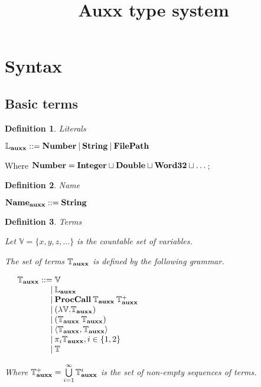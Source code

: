 \documentclass[a4paper]{article}
\date{}
\title{Auxx type system}
\newtheorem{defin}{Definition}
\begin{document}
\maketitle

\tableofcontents

\newpage

\section{Syntax}

\subsection{Basic terms}

\begin{defin} Literals

  $\mathbb{L}_{\bf auxx} ::= {\bf Number} \: | \: {\bf String} \: | \: {\bf FilePath}$
\end{defin}

Where ${\bf Number} = {\bf Integer} \sqcup {\bf Double} \sqcup  {\bf Word32} \sqcup \dots$;

\begin{defin} Name

  ${\bf Name}_{\bf auxx} ::= {\bf String}$

\end{defin}

\begin{defin} Terms

Let $\mathbb{V} = \{ x, y, z, \dots \}$ is the countable set of variables.

The set of terms $\mathbb{T}_{\bf auxx}$ is defined by the following grammar.

$\begin{array}{lll}
&\mathbb{T}_{\bf auxx} ::= \mathbb{V}& \\
&\quad\quad\quad\quad | \: \mathbb{L}_{\bf auxx}& \\
&\quad\quad\quad\quad | \: {\bf ProcCall} \: \mathbb{T}_{\bf auxx} \: \mathbb{T}_{\bf auxx}^{+}&\\
&\quad\quad\quad\quad | \: (\lambda \mathbb{V}. \mathbb{T}_{\bf auxx}) & \\
&\quad\quad\quad\quad | \: (\mathbb{T}_{\bf auxx} \: \mathbb{T}_{\bf auxx})& \\
&\quad\quad\quad\quad | \: \langle \mathbb{T}_{\bf auxx}, \mathbb{T}_{\bf auxx} \rangle&\\
&\quad\quad\quad\quad | \: \pi_i \mathbb{T}_{\bf auxx}, i \in \{ 1,2 \}& \\
&\quad\quad\quad\quad | \: \mathbb{T} &
\end{array}$

Where $\mathbb{T}_{\bf auxx}^{+} = \bigcup \limits_{i = 1}^{\infty} \mathbb{T}_{\bf auxx}^i$ is the set of
non-empty sequences of terms.

\end{defin}
\end{document}
